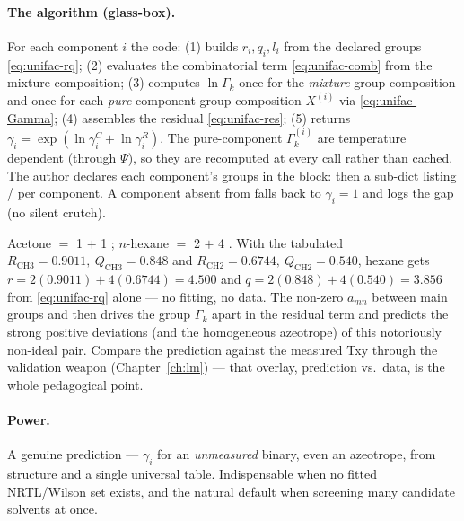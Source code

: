 \documentclass[11pt,a4paper]{article}
\begin{document}
\paragraph{The algorithm (glass-box).} For each component $i$ the code:
(1) builds $r_i, q_i, l_i$ from the declared groups
\eqref{eq:unifac-rq}; (2) evaluates the combinatorial term
\eqref{eq:unifac-comb} from the mixture composition; (3) computes
$\ln \Gamma_k$ once for the \emph{mixture} group composition and once for
each \emph{pure}-component group composition $X^{(i)}$ via
\eqref{eq:unifac-Gamma}; (4) assembles the residual
\eqref{eq:unifac-res}; (5) returns $\gamma_i = \exp(\ln\gamma_i^C +
\ln\gamma_i^R)$. The pure-component $\Gamma_k^{(i)}$ are temperature
dependent (through $\Psi$), so they are recomputed at every call rather
than cached. The author declares each component's groups in the
 block:  then a
 sub-dict listing / per
component. A component absent from  falls back to
$\gamma_i = 1$ and logs the gap (no silent crutch).

\begin{example}
Acetone $=$ 1  $+$ 1 ; $n$-hexane $=$ 2 
$+$ 4 . With the tabulated $R_{\mathrm{CH3}} = 0.9011,\
Q_{\mathrm{CH3}} = 0.848$ and $R_{\mathrm{CH2}} = 0.6744,\
Q_{\mathrm{CH2}} = 0.540$, hexane gets
$r = 2(0.9011) + 4(0.6744) = 4.500$ and
$q = 2(0.848) + 4(0.540) = 3.856$ from \eqref{eq:unifac-rq} alone ---
no fitting, no data. The non-zero $a_{mn}$ between main groups
\code{CH2CO} and \code{CH2} then drives the group $\Gamma_k$ apart in the
residual term and predicts the strong positive deviations (and the
homogeneous azeotrope) of this notoriously non-ideal pair. Compare the
prediction against the measured Txy through the validation weapon
(Chapter~\ref{ch:lm}) --- that overlay, prediction vs.\ data, is the
whole pedagogical point.
\end{example}

\paragraph{Power.} A genuine prediction --- $\gamma_i$ for an
\emph{unmeasured} binary, even an azeotrope, from structure and a single
universal table. Indispensable when no fitted NRTL/Wilson set exists, and
the natural default when screening many candidate solvents at once.
\end{document}
